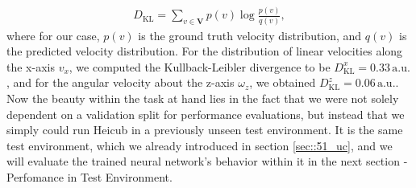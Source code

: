 \begin{align}
	D_\text{KL} = \sum_{v\in \bm{V}}p(v)\log\frac{p(v)}{q(v)},
\end{align}
where for our case, $p(v)$ is the ground truth velocity distribution, and $q(v)$ is the predicted velocity distribution. For the distribution of linear velocities along the x-axis $v_x$, we computed the Kullback-Leibler divergence to be $D^x_\text{KL}=0.33\,\text{a.u.}$, and for the angular velocity about the z-axis $\omega_z$, we obtained $D^z_\text{KL}=0.06\,\text{a.u.}$. Now the beauty within the task at hand lies in the fact that we were not solely dependent on a validation split for performance evaluations, but instead that we simply could run Heicub in a previously unseen test environment. It is the same test environment, which we already introduced in section \ref{sec::51_uc}, and we will evaluate the trained neural network's behavior within it in the next section - Perfomance in Test Environment.
